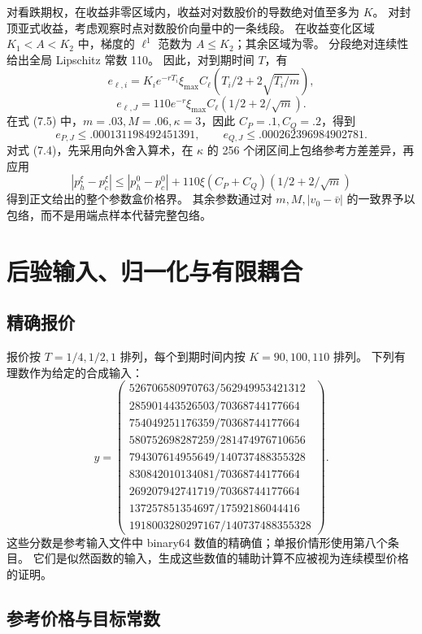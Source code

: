 对看跌期权，在收益非零区域内，收益对对数股价的导数绝对值至多为 \(K\)。
对封顶亚式收益，考虑观察时点对数股价向量中的一条线段。
在收益变化区域 \(K_1<A<K_2\) 中，梯度的 \(\ell^1\) 范数为 \(A\le K_2\)；其余区域为零。
分段绝对连续性给出全局 Lipschitz 常数 110。
因此，对到期时间 \(T\)，有
\[
e_{\ell,i}=K_i e^{-rT_i}\xi_{\max}C_\ell
\left(T_i/2+2\sqrt{T_i/m}\right),
\]
\[
e_{\ell,J}=110e^{-r}\xi_{\max}C_\ell
\left(1/2+2/\sqrt m\right).
\tag{E.3}
\]
在式 (7.5) 中，\(m=.03,M=.06,\kappa=3\)，因此 \(C_P=.1,C_Q=.2\)，得到
\[
e_{P,J}\le.000131198492451391,\qquad
e_{Q,J}\le.000262396984902781.
\tag{E.4}
\]
对式 (7.4)，先采用向外舍入算术，在 \(\kappa\) 的 256 个闭区间上包络参考方差差异，再应用
\[
|p_h^\xi-p_c^\xi|
\le |p_h^0-p_c^0|+
110\xi(C_P+C_Q)(1/2+2/\sqrt m)
\]
得到正文给出的整个参数盒价格界。
其余参数通过对
\(m,M,|v_0-\bar v|\) 的一致界予以包络，而不是用端点样本代替完整包络。

\section{后验输入、归一化与有限耦合}

\subsection{精确报价}

报价按 \(T=1/4,1/2,1\) 排列，每个到期时间内按 \(K=90,100,110\) 排列。
下列有理数作为给定的合成输入：
\[
y=\begin{pmatrix}
526706580970763/562949953421312\\
285901443526503/70368744177664\\
754049251176359/70368744177664\\
580752698287259/281474976710656\\
794307614955649/140737488355328\\
830842010134081/70368744177664\\
269207942741719/70368744177664\\
137257851354697/17592186044416\\
1918003280297167/140737488355328
\end{pmatrix}.
\tag{F.1}
\]
这些分数是参考输入文件中 binary64 数值的精确值；单报价情形使用第八个条目。
它们是似然函数的输入，生成这些数值的辅助计算不应被视为连续模型价格的证明。

\subsection{参考价格与目标常数}


